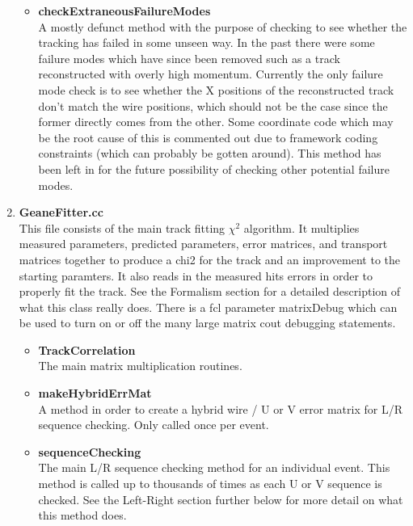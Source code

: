 \documentclass{article}
\begin{document}
\begin{enumerate}
\begin{itemize}
          \item{\bf{checkExtraneousFailureModes}} \\
          A mostly defunct method with the purpose of checking to see whether the tracking has failed in some unseen way. In the past there were some failure modes which have since been removed such as a track reconstructed with overly high momentum. Currently the only failure mode check is to see whether the X positions of the reconstructed track don't match the wire positions, which should not be the case since the former directly comes from the other. Some coordinate code which may be the root cause of this is commented out due to framework coding constraints (which can probably be gotten around). This method has been left in for the future possibility of checking other potential failure modes.

        \end{itemize}

      \item{\bf{GeaneFitter.cc}} \\
      This file consists of the main track fitting $\chi^{2}$ algorithm. It multiplies measured parameters, predicted parameters, error matrices, and transport matrices together to produce a chi2 for the track and an improvement to the starting paramters. It also reads in the measured hits errors in order to properly fit the track. See the Formalism section for a detailed description of what this class really does. There is a fcl parameter matrixDebug which can be used to turn on or off the many large matrix cout debugging statements.

        \begin{itemize}

          \item{\bf{TrackCorrelation}} \\
          The main matrix multiplication routines.

          \item{\bf{makeHybridErrMat}} \\
          A method in order to create a hybrid wire / U or V error matrix for L/R sequence checking. Only called once per event.

          \item{\bf{sequenceChecking}} \\ 
          The main L/R sequence checking method for an individual event. This method is called up to thousands of times as each U or V sequence is checked. See the Left-Right section further below for more detail on what this method does.


\end{itemize}
\end{enumerate}
\end{document}
